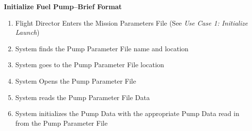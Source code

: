 \documentclass[letterpaper]{article}
\begin{document}
\noindent
\textbf{Initialize Fuel Pump--Brief Format}
\begin{enumerate}
   \item Flight Director Enters the Mission Parameters File (See 
      \textit{Use Case 1: Initialize Launch})
   \item System finds the Pump Parameter File name and location
   \item System goes to the Pump Parameter File location
   \item System Opens the Pump Parameter File
   \item System reads the Pump Parameter File Data
   \item System initializes the Pump Data with the appropriate Pump 
      Data read in from the Pump Parameter File
\end{enumerate}
\end{document}
